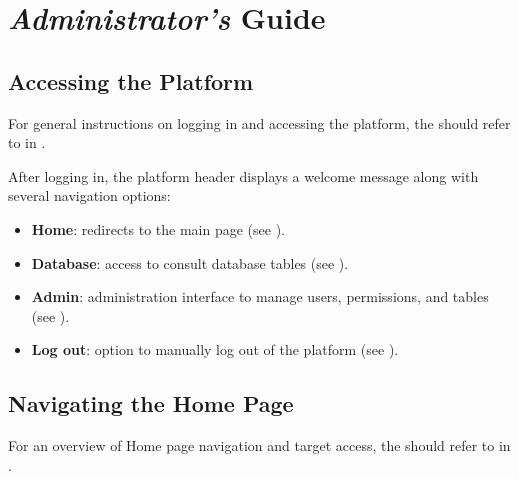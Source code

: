 
\part{\textsl{Administrator's} Guide} \label{part:admin}

  
\chapter{Accessing the Platform}

For general instructions on logging in and accessing the platform, the \admin should refer to  in \userpart.

After logging in, the platform header displays a welcome message along with several navigation options:

\begin{itemize}
   	\item \textbf{Home}: redirects to the main page (see ).
   	\item \textbf{Database}: access to consult database tables (see ).
   	\item \textbf{Admin}: administration interface to manage users, permissions, and tables (see ).
   	\item \textbf{Log out}: option to manually log out of the platform (see ).
\end{itemize}

    

\chapter{Navigating the Home Page} \label{chap:admin-homepage}

For an overview of Home page navigation and target access, the \admin should refer to  in \userpart.






